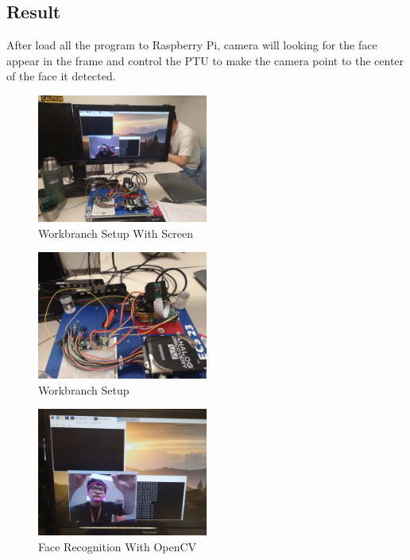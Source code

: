 \documentclass{article}
\begin{document}
\subsection{Result}
	After load all the program to Raspberry Pi, camera will looking for the face appear in the frame and control the PTU to make the camera point to the center of the face it detected.
	\begin{figure}[hb]
		\centering
		\includegraphics[width=0.5\textwidth]{img/Lab03_08.jpg}
		\caption{Workbranch Setup With Screen} 
		\label{BBD}
	\end{figure}
	\begin{figure}[hb]
		\centering
		\includegraphics[width=0.5\textwidth]{img/Lab03_13.jpg}
		\caption{Workbranch Setup} 
		\label{BBD}
	\end{figure}
	\begin{figure}[hb]
		\centering
		\includegraphics[width=0.5\textwidth]{img/Lab03_09.jpg}
		\caption{Face Recognition With OpenCV} 
		\label{BBD}
	\end{figure}
\clearpage
\end{document}

